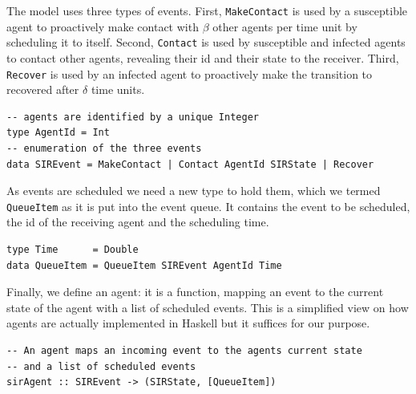 The model uses three types of events. First, \texttt{MakeContact} is used by a susceptible agent to proactively make contact with $\beta$ other agents per time unit by scheduling it to itself. Second, \texttt{Contact} is used by susceptible and infected agents to contact other agents, revealing their id and their state to the receiver. Third, \texttt{Recover} is used by an infected agent to proactively make the transition to recovered after $\delta$ time units.

\begin{footnotesize}
\begin{verbatim}
-- agents are identified by a unique Integer
type AgentId = Int
-- enumeration of the three events
data SIREvent = MakeContact | Contact AgentId SIRState | Recover 
\end{verbatim}
\end{footnotesize}

As events are scheduled we need a new type to hold them, which we termed \texttt{QueueItem} as it is put into the event queue. It contains the event to be scheduled, the id of the receiving agent and the scheduling time.

\begin{footnotesize}
\begin{verbatim}
type Time      = Double
data QueueItem = QueueItem SIREvent AgentId Time
\end{verbatim}
\end{footnotesize}

Finally, we define an agent: it is a function, mapping an event to the current state of the agent with a list of scheduled events. This is a simplified view on how agents are actually implemented in Haskell but it suffices for our purpose.

\begin{footnotesize}
\begin{verbatim}
-- An agent maps an incoming event to the agents current state 
-- and a list of scheduled events
sirAgent :: SIREvent -> (SIRState, [QueueItem])
\end{verbatim}
\end{footnotesize}

